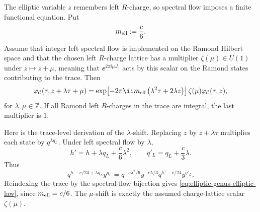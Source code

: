 The elliptic variable \(z\) remembers left \(R\)-charge, so spectral flow
imposes a finite functional equation.  Put
\begin{equation}
  m_{\rm ell}:=\frac c6 .
  \label{eq:elliptic-genus-index}
\end{equation}
Assume that integer left spectral flow is implemented on the Ramond Hilbert
space and that the chosen left \(R\)-charge lattice has a multiplier
\(\zeta(\mu)\in U(1)\) under \(z\mapsto z+\mu\), meaning that
\(\ee^{2\pi\ii\mu J_0}\) acts by this scalar on the Ramond states contributing
to the trace.  Then
\begin{equation}
  \varphi_{\mathcal C}(\tau,z+\lambda\tau+\mu)
  =
  \exp\!\left[
    -2\pi\ii m_{\rm ell}\left(\lambda^2\tau+2\lambda z\right)
  \right]
  \zeta(\mu)
  \varphi_{\mathcal C}(\tau,z),
  \label{eq:elliptic-genus-elliptic-law}
\end{equation}
for \(\lambda,\mu\in\mathbb Z\).  If all Ramond left \(R\)-charges in the
trace are integral, the last multiplier is \(1\).

Here is the trace-level derivation of the \(\lambda\)-shift.  Replacing \(z\)
by
\(z+\lambda\tau\) multiplies each state by \(q^{\lambda q_L}\).  Under left
spectral flow by \(\lambda\),
\begin{equation}
  h' = h+\lambda q_L+\frac c6\lambda^2,
  \qquad
  q'_L=q_L+\frac c3\lambda .
  \label{eq:elliptic-genus-spectral-flow-reindex}
\end{equation}
Thus
\begin{equation}
  q^{h-c/24+\lambda q_L}y^{q_L}
  =
  q^{-c\lambda^2/6}y^{-c\lambda/3}
  q^{h'-c/24}y^{q'_L}.
  \label{eq:elliptic-genus-elliptic-law-weight}
\end{equation}
Reindexing the trace by the spectral-flow bijection gives
\eqref{eq:elliptic-genus-elliptic-law}, since
\(m_{\rm ell}=c/6\).  The \(\mu\)-shift is exactly the assumed
charge-lattice scalar \(\zeta(\mu)\).

